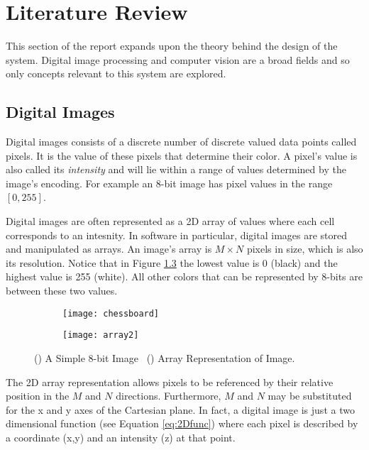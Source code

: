 \chapter{Literature Review}
This section of the report expands upon the theory behind the design of the system. Digital image processing and computer vision are a broad fields and so only concepts relevant to this system are explored.

\section{Digital Images}
Digital images consists of a discrete number of discrete valued data points called pixels. It is the value of these pixels that determine their color. A pixel's value is also called its \emph{intensity} and will lie within a range of values determined by the image's encoding. For example an 8-bit image has pixel values in the range $[0, 255]$. 

Digital images are often represented as a 2D array of values where each cell corresponds to an intesnity. In software in particular,  digital images are stored and manipulated as arrays. An image's array is $M\times N$ pixels in size, which is also its resolution. Notice that in Figure \ref{fig:2Darray} the lowest value is 0 (black) and the highest value is 255 (white). All other colors that can be represented by 8-bits are between these two values.

\begin{figure}[H]
    \centering
    \begin{subfigure}[b]{0.5\linewidth}
      \centering\texttt{[image: chessboard]}
      \caption{\label{fig:fig1}}
    \end{subfigure}%
    \begin{subfigure}[b]{0.5\linewidth}
      \centering\texttt{[image: array2]}
      \caption{\label{fig:fig2}}
    \end{subfigure}
    \caption{() A Simple 8-bit Image ~() Array Representation of Image.}
    \label{fig:2Darray}
\end{figure}
  

The 2D array representation allows pixels to be referenced by their relative position in the $M$ and $N$ directions. Furthermore, $M$ and $N$ may be substituted for the x and y axes of the Cartesian plane. In fact, a digital image is just a two dimensional function (see Equation \ref{eq:2Dfunc}) where each pixel is described by a coordinate (x,y) and an intensity (z) at that point.

